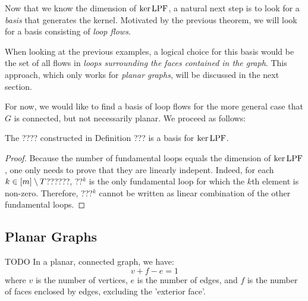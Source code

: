 \documentclass[main.tex]{subfiles}
\begin{document}
Now that we know the dimension of $\ker \text{\textup{LPF}}$, a natural next step is to look for a \emph{basis} that generates the kernel. Motivated by the previous theorem, we will look for a basis consisting of \emph{loop flows}.

When looking at the previous examples, a logical choice for this basis would be the set of all flows in \emph{loops surrounding the faces contained in the graph}. This approach, which only works for \emph{planar graphs}, will be discussed in the next section.

For now, we would like to find a basis of loop flows for the more general case that $G$ is connected, but not necessarily planar. We proceed as follows:

\begin{definition}

\end{definition}

\begin{theorem}
The ???? constructed in Definition ??? is a basis for $\ker \text{\textup{LPF}}$.
\end{theorem}
\begin{proof}
Because the number of fundamental loops equals the dimension of $\ker \text{\textup{LPF}}$, one only needs to prove that they are linearly indepent. Indeed, for each $k \in [m]\setminus T$??????, ??$^k$ is the only fundamental loop for which the $k$th element is non-zero. Therefore, ???$^k$ cannot be written as linear combination of the other fundamental loops.
\end{proof}





\subsection{Planar Graphs}

\begin{corollary}
TODO In a planar, connected graph, we have:
$$v + f - e = 1$$
where $v$ is the number of vertices, $e$ is the number of edges, and $f$ is the number of faces enclosed by edges, excluding the 'exterior face'.
\end{corollary}

\end{document}
